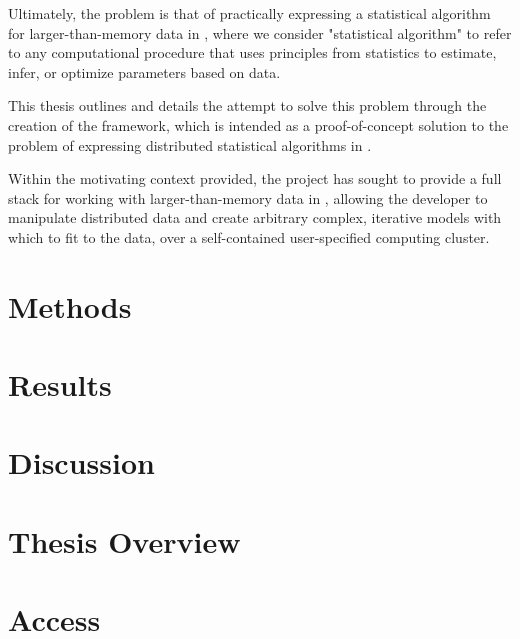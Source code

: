 Ultimately, the problem is that of practically expressing a statistical algorithm for larger-than-memory data in \R{}, where we consider "statistical algorithm" to refer to any computational procedure that uses principles from statistics to estimate, infer, or optimize parameters based on data.

This thesis outlines and details the attempt to solve this problem through the creation of the \lsr{} framework, which is intended as a proof-of-concept solution to the problem of expressing distributed statistical algorithms in \R{}.

Within the motivating context provided, the \lsr{} project has sought to provide a full stack for working with larger-than-memory data in \R{}, allowing the developer to manipulate distributed data and create arbitrary complex, iterative models with which to fit to the data, over a self-contained user-specified computing cluster.

\section{Methods}\label{sec:methods}

\section{Results}\label{sec:results}

\section{Discussion}\label{sec:discussion}

\section{Thesis Overview}\label{sec:intro-overview}

\section{Access}\label{sec:access}

